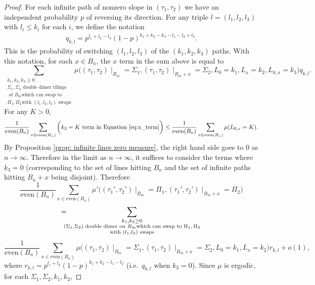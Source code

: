 \documentclass[11pt]{article}
\theoremstyle{remark}
\theoremstyle{definition}
\begin{document}
\begin{proof}
    For each infinite path of nonzero slope in $(\tau_1, \tau_2)$ we have an independent probability $p$ of reversing its direction. For any triple $l =(l_1,l_2,l_3)$ with $l_i\leq k_i$ for each $i$, we define the notation
    \begin{align*}
        q_{k,l} = p^{l_1+l_2-l_3}(1-p)^{k_1+k_2-k_3-l_1-l_2+l_3}.
    \end{align*}
    This is the probability of switching $(l_1,l_2,l_3)$ of the $(k_1,k_2,k_3)$ paths. With this notation, for each $x\in B_n$, the $x$ term in the sum above is equal to
    \begin{equation}\label{eq:x_term}
      \sum_{\substack{k_1,k_2,k_3 \geq 0 \\ \Sigma_1,\Sigma_2 \text{ double dimer tilings} \\ \text{ of } B_m
        \text{which can swap to} \\ \Pi_1,\Pi_2 \text{with }(l_1,l_2,l_3) \text{ swaps}}}  \!\!\!\!\!\!  \mu\bigg((\tau_1,\tau_2)\mid_{B_m} = \Sigma_1, (\tau_1,\tau_2)\mid_{B_m+x} = \Sigma_2, L_0=k_1, L_x = k_2, L_{0,x} = k_3\bigg) q_{k,l}.
    \end{equation}
    For any $K> 0$, 
    \begin{align*}
        \frac{1}{\text{even}(B_n)} \sum_{x\in \text{even}(B_n)} \bigg( \text{$k_3 = K$ term in Equation \eqref{eq:x_term}} \bigg) \leq \frac{1}{\text{even}(B_n)}\sum_{x\in \text{even}(B_n)} \mu(L_{0,x} = K). 
    \end{align*}
    By Proposition \ref{prop: infinite lines zero measure}, the right hand side goes to $0$ as $n\to \infty$. Therefore in the limit as $n\to \infty$, it suffices to consider the terms where $k_3 = 0$ (corresponding to the set of lines hitting $B_n$ and the set of infinite paths hitting $B_n + x$ being disjoint). 
    Therefore 
$$
        \frac{1}{\text{even}(B_n)} \sum_{x\in \text{even}(B_n)} \mu'\bigg((\tau_1',\tau_2')\mid_{B_m} = \Pi_1, (\tau_1',\tau_2')\mid_{B_m+x} = \Pi_2\bigg) $$ $$
        =\!\!\!\! \sum_{\substack{k_1,k_2 \geq 0 \\ (\Sigma_1,\Sigma_2) \text{ double dimer on }B_m 
        \text{which can swap to $\Pi_1,\Pi_2$}\\\text{with }(l_1, l_2)\text{ swaps}}}   \\ $$ $$\frac{1}{\text{even}(B_n)} \sum_{x\in \text{even}(B_n)} \mu\bigg((\tau_1,\tau_2)\mid_{B_m} = \Sigma_1, (\tau_1,\tau_2)\mid_{B_m+x} = \Sigma_2, L_0 = k_1, L_x = k_2\bigg) r_{k,l} + o(1),
$$
    where $r_{k,l} = p^{l_1+l_2} (1-p)^{k_1+k_2-l_1-l_2}$ (i.e.\ $q_{k,l}$ when $k_3 =0$). Since $\mu$ is ergodic, for each $\Sigma_1,\Sigma_2,k_1,k_2$, 

\end{proof}
\end{document}
